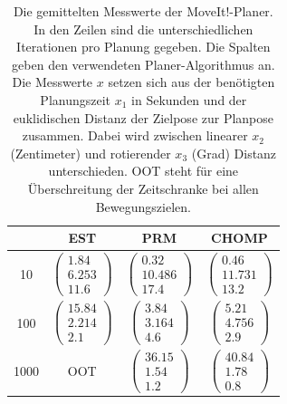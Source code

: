 \begin{table}
	\centering
	\begin{tabular}{|c|c|c|c|}
		\hline  	& EST & PRM & CHOMP \\ 
		\hline 10 	& 
		$\left(\begin{array}{c} 1.84 \\ 6.253 \\ 11.6  \end{array}\right)$ & 
		$\left(\begin{array}{c} 0.32 \\ 10.486 \\ 17.4  \end{array}\right)$ &
		$\left(\begin{array}{c} 0.46 \\ 11.731 \\ 13.2  \end{array}\right)$ \\ 
		\hline 100 	&
		$\left(\begin{array}{c} 15.84 \\ 2.214 \\ 2.1  \end{array}\right)$ & 
		$\left(\begin{array}{c} 3.84 \\ 3.164 \\ 4.6  \end{array}\right)$ &
		$\left(\begin{array}{c} 5.21 \\ 4.756 \\ 2.9  \end{array}\right)$ \\ 
		\hline 1000 &  
		OOT &
		$\left(\begin{array}{c} 36.15 \\ 1.54 \\ 1.2  \end{array}\right)$ &
		$\left(\begin{array}{c} 40.84 \\ 1.78 \\ 0.8  \end{array}\right)$ \\ 
		\hline 
	\end{tabular}
	
	\caption[Gemittelte Messwerte der MoveIt!-Planer-Algorithmen]{Die gemittelten Messwerte der MoveIt!-Planer. In den Zeilen sind die unterschiedlichen Iterationen pro Planung gegeben. Die Spalten geben den verwendeten Planer-Algorithmus an. Die Messwerte $x$ setzen sich aus der benötigten Planungszeit $x_1$ in Sekunden und der euklidischen Distanz der Zielpose zur Planpose zusammen. Dabei wird zwischen linearer $x_2$ (Zentimeter) und rotierender $x_3$ (Grad) Distanz unterschieden. OOT steht für eine Überschreitung der Zeitschranke bei allen Bewegungszielen.}
	
	\label{tab:mesplan}
\end{table}
	
